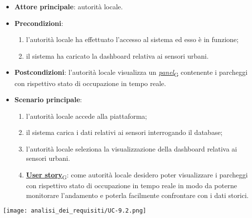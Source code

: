 \begin{itemize}
	\item \textbf{Attore principale}: autorità locale.
	\item \textbf{Precondizioni}:
	      \begin{enumerate}
		      \item l'autorità locale ha effettuato l'accesso al sistema ed esso è in funzione;
		      \item il sistema ha caricato la dashboard relativa ai sensori urbani.
	      \end{enumerate}
	\item \textbf{Postcondizioni}: l'autorità locale visualizza un \href{https://7last.github.io/docs/rtb/documentazione-interna/glossario\#panel}{\textit{panel}\textsubscript{G}} contenente i parcheggi con rispettivo stato di occupazione in tempo reale.
	\item \textbf{Scenario principale}:
	      \begin{enumerate}
		      \item l'autorità locale accede alla piattaforma;
		      \item il sistema carica i dati relativi ai sensori interrogando il database;
		      \item l'autorità locale seleziona la visualizzazione della dashboard relativa ai sensori urbani.
	\item \href{https://7last.github.io/docs/rtb/documentazione-interna/glossario\#user-story}{\textbf{User story}\textsubscript{G}}:
	      come autorità locale desidero poter visualizzare i parcheggi con rispettivo stato di occupazione in tempo reale in modo da poterne monitorare l'andamento
	      e poterla facilmente confrontare con i dati storici.
		  \end{enumerate}
\end{itemize}
\begin{center}
	\texttt{[image: analisi\_dei\_requisiti/UC-9.2.png]}
\end{center}


